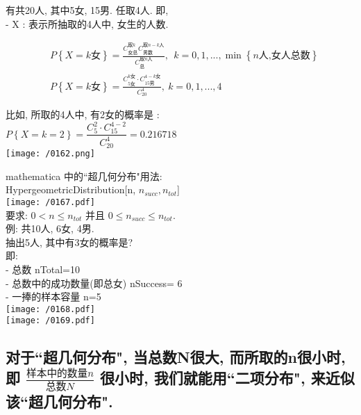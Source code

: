 \documentclass[UTF8]{ctexart}
\begin{document}
	\begin{myEnvSample}
		有共20人, 其中5女, 15男. 任取4人. 即,  \\
		- X : 表示所抽取的4人中, 女生的人数. 
						
		\begin{align*}  %
	&P\left\{ X=k\text{女} \right\} =\frac{C_{\text{女总}}^{\text{取}k}C_{\text{男数}}^{\text{取}n-k\text{人}}}{C_{\text{总}}^{\text{取}n\text{人}}},\ \ k=0,1,...,\min \left\{ n\text{人,女人总数} \right\}\\
&P\left\{ X=k\text{女} \right\} =\frac{C_{5\text{女}}^{k\text{女}}\cdot C_{15\text{男}}^{4-k\text{女}}}{C_{20}^{4}},\ k=0,1,...,4
		\end{align*}
	
	比如, 所取的4人中, 有2女的概率是 : \\
	$	P\left\{ X=k=2 \right\} =\dfrac{C_{5}^{2}\cdot C_{15}^{4-2}}{C_{20}^{4}}=0.216718	$ \\
	
	\texttt{[image: /0162.png]}	
	\end{myEnvSample}
	\vspace{1em} 
	
	
	\begin{myEnvSample}
mathematica 中的``超几何分布"用法: \\
HypergeometricDistribution[n, $n_{succ}, n_{tot}$] \\

\texttt{[image: /0167.pdf]} \\
要求:  $0 < n \leq n_{tot}$ 并且 $0 \leq n_{succ} \leq n_{tot} $. \\

例: 共10人, 6女, 4男. \\
抽出5人, 其中有3女的概率是? \\
即: \\
- 总数 nTotal=10 \\
- 总数中的成功数量(即总女) nSuccess= 6 \\
- 一捧的样本容量 n=5 \\

\texttt{[image: /0168.pdf]} \\
\texttt{[image: /0169.pdf]} 

	\end{myEnvSample}
	
	
	
	
	\subsection{对于``超几何分布", 当总数N很大, 而所取的n很小时, 即 $\frac{\text{样本中的数量}n}{\text{总数}N}$ 很小时, 我们就能用``二项分布", 来近似该``超几何分布".}
	
\end{document}
